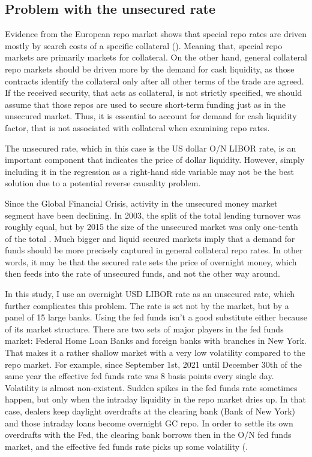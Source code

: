 \documentclass[11pt,a4paper,english,oneside]{article}
\begin{document}

\subsection{Problem with the unsecured rate} \label{sec:unsecured}

Evidence from the European repo market shows that special repo rates are driven mostly by search costs of a specific collateral (\citep{schaffner2019}). Meaning that, special repo markets are primarily markets for collateral. On the other hand, general collateral repo markets should be driven more by the demand for cash liquidity, as those contracts identify the collateral only after all other terms of the trade are agreed. If the received security, that acts as collateral, is not strictly specified, we should assume that those repos are used to secure short-term funding just as in the unsecured market. Thus, it is essential to account for demand for cash liquidity factor, that is not associated with collateral when examining repo rates.

The unsecured rate, which in this case is the US dollar O/N LIBOR rate, is an important component that indicates the price of dollar liquidity. However, simply including it in the regression as a right-hand side variable may not be the best solution due to a potential reverse causality problem.

Since the Global Financial Crisis, activity in the unsecured money market segment have been declining. In 2003, the split of the total lending turnover was roughly equal, but by 2015 the size of the unsecured market was only one-tenth of the total \citet{fiore2018}. Much bigger and liquid secured markets imply that a demand for funds should be more precisely captured in general collateral repo rates. In other words, it may be that the secured rate sets the price of overnight money, which then feeds into the rate of unsecured funds, and not the other way around.

In this study, I use an overnight USD LIBOR rate as an unsecured rate, which further complicates this problem. The rate is set not by the market, but by a panel of 15 large banks. Using the fed funds isn't a good substitute either because of its market structure. There are two sets of major players in the fed funds market: Federal Home Loan Banks and foreign banks with branches in New York. That makes it a rather shallow market with a very low volatility compared to the repo market. For example, since September 1st, 2021 until December 30th of the same year the effective fed funds rate was 8 basis points every single day. Volatility is almost non-existent. Sudden spikes in the fed funds rate sometimes happen, but only when the intraday liquidity in the repo market dries up. In that case, dealers keep daylight overdrafts at the clearing bank (Bank of New York) and those intraday loans become overnight GC repo. In order to settle its own overdrafts with the Fed, the clearing bank borrows then in the O/N fed funds market, and the effective fed funds rate picks up some volatility (\citep{gmn22}.
\end{document}
